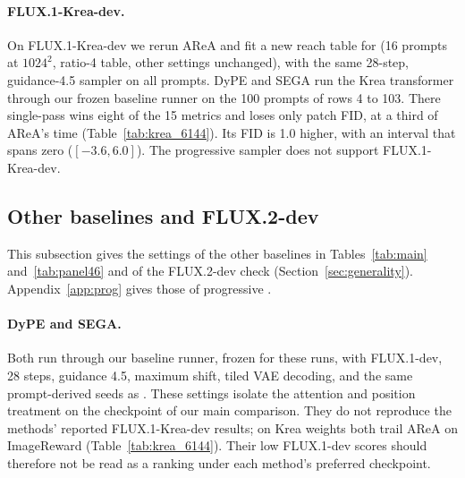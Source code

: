 \paragraph{FLUX.1-Krea-dev.} On FLUX.1-Krea-dev we rerun AReA and fit a new reach table for \sca{} (16 prompts at $1024^2$, ratio-4 table, other settings unchanged), with the same 28-step, guidance-4.5 sampler on all \nkrea{} prompts. DyPE and SEGA run the Krea transformer through our frozen baseline runner on the 100 prompts of rows 4 to 103. There single-pass \sca{} wins eight of the 15 metrics and loses only patch FID, at a third of AReA's time (Table~\ref{tab:krea_6144}). Its FID is 1.0 higher, with an interval that spans zero ($[-3.6,6.0]$). The progressive sampler does not support FLUX.1-Krea-dev.


\subsection{Other baselines and FLUX.2-dev}
\label{app:additional_protocols}

This subsection gives the settings of the other baselines in Tables~\ref{tab:main} and~\ref{tab:panel46} and of the FLUX.2-dev check (Section~\ref{sec:generality}). Appendix~\ref{app:prog} gives those of progressive \sca{}.

\paragraph{DyPE and SEGA.} Both run through our baseline runner, frozen for these runs, with FLUX.1-dev, 28 steps, guidance 4.5, maximum shift, tiled VAE decoding, and the same prompt-derived seeds as \sca{}. These settings isolate the attention and position treatment on the checkpoint of our main comparison. They do not reproduce the methods' reported FLUX.1-Krea-dev results; on Krea weights both trail AReA on ImageReward (Table~\ref{tab:krea_6144}). Their low FLUX.1-dev scores should therefore not be read as a ranking under each method's preferred checkpoint.

